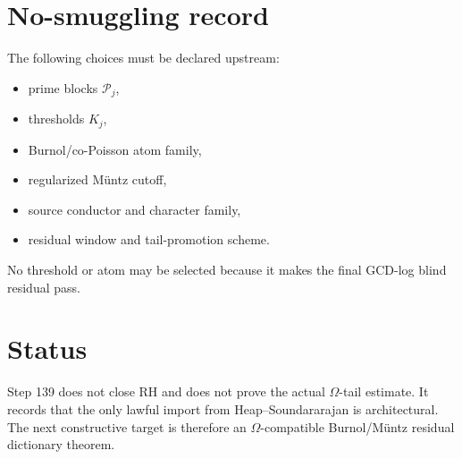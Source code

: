 \documentclass[11pt]{article}
\begin{document}
\section{No-smuggling record}
The following choices must be declared upstream:
\begin{itemize}
\item prime blocks \(\mathcal P_j\),
\item thresholds \(K_j\),
\item Burnol/co-Poisson atom family,
\item regularized M\"untz cutoff,
\item source conductor and character family,
\item residual window and tail-promotion scheme.
\end{itemize}
No threshold or atom may be selected because it makes the final GCD-log blind residual pass.

\section{Status}
Step 139 does not close RH and does not prove the actual \(\Omega\)-tail estimate.  It records that the only lawful import from Heap--Soundararajan is architectural.  The next constructive target is therefore an \(\Omega\)-compatible Burnol/M\"untz residual dictionary theorem.
\end{document}
